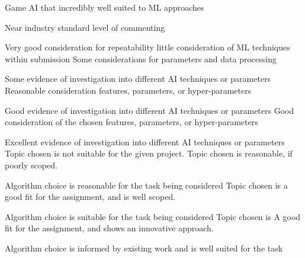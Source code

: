 \documentclass{../fal_assignment}
\begin{document}
\begin{markingrubric}
        \grade Game AI that incredibly well suited to ML approaches
            \par Near industry standard level of commenting
            \par Very good consideration for repeatability
%
        \grade \fail little consideration of ML techniques within submission
        \grade Some considerations for parameters and data processing
            \par Some evidence of investigation into different AI techniques or parameters
        \grade Reasonable consideration features, parameters, or hyper-parameters
            \par Good evidence of investigation into different AI techniques or parameters
        \grade  Good consideration of the chosen features, parameters, or hyper-parameters
            \par Excellent evidence of investigation into different AI techniques or parameters
%
        \grade \fail Topic chosen is not suitable for the given project.
        \grade Topic chosen is reasonable, if poorly scoped.
        \par Algorithm choice is reasonable for the task being considered
        \grade Topic chosen is a good fit for the assignment, and is well scoped.
        \par Algorithm choice is suitable for the task being considered
        \grade Topic chosen is A good fit for the assignment, and shows an innovative approach.
        \par Algorithm choice is informed by existing work and is well suited for the task 
%
\end{markingrubric}
\end{document}

